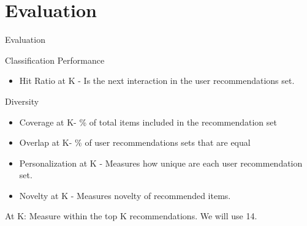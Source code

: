 \documentclass{beamer}
\begin{document}
\section{Evaluation}
\begin{frame}{Evaluation}
\begin{block}{Classification Performance}
\begin{itemize}
    \item Hit Ratio at K - Is the next interaction in the user recommendations set.
\end{itemize}
\end{block}

\begin{block}{Diversity}
\begin{itemize}
\item Coverage at K- \% of total items included in the recommendation set
\item Overlap at K- \% of user recommendations sets that are equal
\item Personalization at K - Measures how unique are each user recommendation set.
\item Novelty at K - Measures novelty of recommended items.
\end{itemize}
\end{block}   
At K: Measure within the top K recommendations. We will use 14.
\end{frame}
\end{document}
